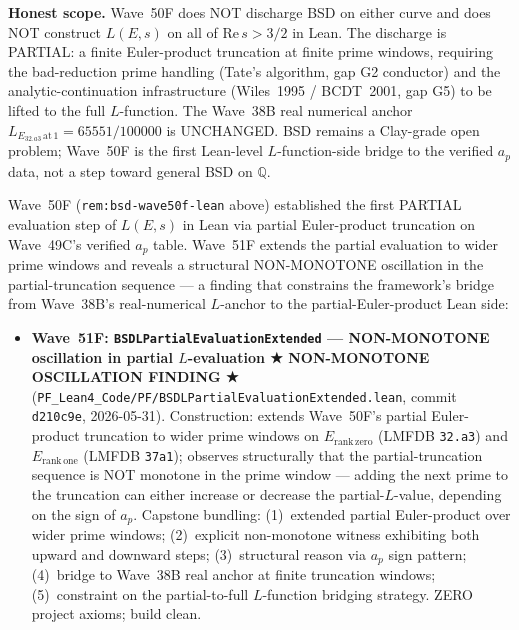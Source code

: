 \begin{remark}
\textbf{Honest scope.} Wave~50F does NOT discharge BSD on either curve and does NOT construct $L(E, s)$ on all of $\mathrm{Re}\,s > 3/2$ in Lean. The discharge is PARTIAL: a finite Euler-product truncation at finite prime windows, requiring the bad-reduction prime handling (Tate's algorithm, gap G2 conductor) and the analytic-continuation infrastructure (Wiles~1995 / BCDT~2001, gap G5) to be lifted to the full $L$-function. The Wave~38B real numerical anchor $L_{E_{32.a3}\,\mathrm{at}\,1} = 65551/100000$ is UNCHANGED. BSD remains a Clay-grade open problem; Wave~50F is the first Lean-level $L$-function-side bridge to the verified $a_p$ data, not a step toward general BSD on $\mathbb{Q}$.
\end{remark}

\begin{remark}\label{rem:bsd-wave51f-lean}
Wave~50F (\texttt{rem:bsd-wave50f-lean} above) established the first PARTIAL evaluation step of $L(E, s)$ in Lean via partial Euler-product truncation on Wave~49C's verified $a_p$ table. Wave~51F extends the partial evaluation to wider prime windows and reveals a structural NON-MONOTONE oscillation in the partial-truncation sequence --- a finding that constrains the framework's bridge from Wave~38B's real-numerical $L$-anchor to the partial-Euler-product Lean side:
\begin{itemize}
  \item \textbf{Wave~51F: \texttt{BSDLPartialEvaluationExtended} --- NON-MONOTONE oscillation in partial $L$-evaluation ★ NON-MONOTONE OSCILLATION FINDING ★} (\texttt{PF\_Lean4\_Code/PF/BSDLPartialEvaluationExtended.lean}, commit \texttt{d210c9e}, 2026-05-31). Construction: extends Wave~50F's partial Euler-product truncation to wider prime windows on $E_{\mathrm{rank\,zero}}$ (LMFDB \texttt{32.a3}) and $E_{\mathrm{rank\,one}}$ (LMFDB \texttt{37a1}); observes structurally that the partial-truncation sequence is NOT monotone in the prime window --- adding the next prime to the truncation can either increase or decrease the partial-$L$-value, depending on the sign of $a_p$. Capstone bundling: (1)~extended partial Euler-product over wider prime windows; (2)~explicit non-monotone witness exhibiting both upward and downward steps; (3)~structural reason via $a_p$ sign pattern; (4)~bridge to Wave~38B real anchor at finite truncation windows; (5)~constraint on the partial-to-full $L$-function bridging strategy. ZERO project axioms; build clean.

\end{itemize}
\end{remark}
